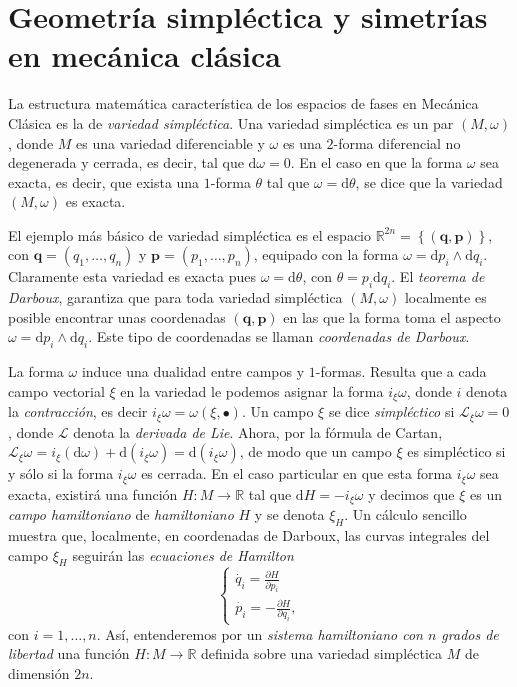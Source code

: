 \documentclass[12pt,a4paper,twoside]{article}
\theoremstyle{definition} \newtheorem{defn}[thm]{Definición}
\theoremstyle{definition} \newtheorem{ejemplo}[thm]{Ejemplo}
\theoremstyle{definition} \newtheorem{ejercicio}[thm]{Ejercicio}
\theoremstyle{remark} \newtheorem*{obs}{Observación}
\def\RR{\mathbb{R}}
\def\dd{\mathrm{d}}
\def\lie{\mathscr{L}}
\newcommand{\vect}[1]{\mathbf{#1}}
\newcommand{\parcial}[2]{\frac{\partial #1}{\partial #2}}
\begin{document}
\section{Geometría simpléctica y simetrías en mecánica clásica}
La estructura matemática característica de los espacios de fases en Mecánica Clásica es la de \emph{variedad simpléctica}. Una variedad simpléctica es un par $(M,\omega)$, donde $M$ es una variedad diferenciable y $\omega$ es una $2$-forma diferencial no degenerada y cerrada, es decir, tal que $\dd \omega=0$. En el caso en que la forma $\omega$ sea exacta, es decir, que exista una $1$-forma $\theta$ tal que $\omega=\dd \theta$, se dice que la variedad $(M,\omega)$ es exacta. 

El ejemplo más básico de variedad simpléctica es el espacio $\RR^{2n}=\left\{ (\vect{q},\vect{p}) \right\}$, con $\vect{q}=(q_1,\dots,q_n)$ y $\vect{p}=(p_1,\dots,p_n)$, equipado con la forma $\omega=\dd p_i \wedge \dd q_i$. Claramente esta variedad es exacta pues $\omega=\dd \theta$, con $\theta=p_i \dd q_i$. El \emph{teorema de Darboux}, garantiza que para toda variedad simpléctica $(M,\omega)$ localmente es posible encontrar unas coordenadas $(\vect{q},\vect{p})$ en las que la forma toma el aspecto $\omega=\dd p_i \wedge \dd q_i$. Este tipo de coordenadas se llaman \emph{coordenadas de Darboux}.

La forma $\omega$ induce una dualidad entre campos y $1$-formas. Resulta que a cada campo vectorial $\xi$ en la variedad le podemos asignar la forma $i_{\xi}\omega$, donde $i$ denota la \emph{contracción}, es decir $i_{\xi}\omega=\omega(\xi,\bullet)$. Un campo $\xi$ se dice \emph{simpléctico} si $\lie_{\xi}\omega=0$, donde $\lie$ denota la \emph{derivada de Lie}. Ahora, por la fórmula de Cartan, $\lie_{\xi}\omega=i_{\xi}(\dd \omega)+\dd(i_{\xi}\omega)=\dd(i_{\xi}\omega)$, de modo que un campo $\xi$ es simpléctico si y sólo si la forma $i_{\xi}\omega$ es cerrada. En el caso particular en que esta forma $i_{\xi}\omega$ sea exacta, existirá una función $H:M\rightarrow \RR$ tal que $\dd H=-i_{\xi}\omega$ y decimos que $\xi$ es un \emph{campo hamiltoniano} de \emph{hamiltoniano} $H$ y se denota $\xi_H$. Un cálculo sencillo muestra que, localmente, en coordenadas de Darboux, las curvas integrales del campo $\xi_H$ seguirán las \emph{ecuaciones de Hamilton}
\begin{equation}
  \begin{cases}
    \dot{q_i}=\parcial{H}{p_i}\\ 
    \dot{p_i}=-\parcial{H}{q_i} ,
  \end{cases}
  \label{eq:hamilton}
\end{equation}
con $i=1,\dots,n$.
Así, entenderemos por un \emph{sistema hamiltoniano con $n$ grados de libertad} una función $H:M\rightarrow \RR$ definida sobre una variedad simpléctica $M$ de dimensión $2n$.
\end{document}
